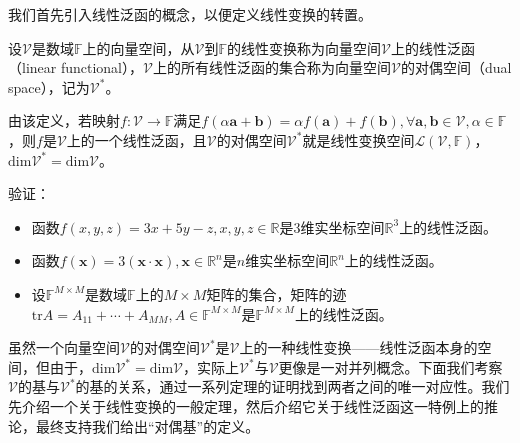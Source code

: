 \documentclass[main.tex]{subfiles}
\begin{document}
我们首先引入线性泛函的概念，以便定义线性变换的转置。

\begin{definition}[线性泛函与对偶空间]\label{def:II.4.4}
设$\mathcal{V}$是数域$\mathbb{F}$上的向量空间，从$\mathcal{V}$到$\mathbb{F}$的线性变换称为向量空间$\mathcal{V}$上的线性泛函（linear functional），$\mathcal{V}$上的所有线性泛函的集合称为向量空间$\mathcal{V}$的对偶空间（dual space），记为$\mathcal{V}^*$。
\end{definition}

由该定义，若映射$f:\mathcal{V}\rightarrow\mathbb{F}$满足$f\left(\alpha\mathbf{a}+\mathbf{b}\right)=\alpha f\left(\mathbf{a}\right)+f\left(\mathbf{b}\right),\forall\mathbf{a},\mathbf{b}\in\mathcal{V},\alpha\in\mathbb{F}$，则$f$是$\mathcal{V}$上的一个线性泛函，且$\mathcal{V}$的对偶空间$\mathcal{V}^*$就是线性变换空间$\mathcal{L}\left(\mathcal{V},\mathbb{F}\right)$，$\mathrm{dim}\mathcal{V}^*=\mathrm{dim}\mathcal{V}$。

\begin{example}
验证：
\begin{itemize}
    \item 函数$f\left(x,y,z\right)=3x+5y-z,x,y,z\in\mathbb{R}$是3维实坐标空间$\mathbb{R}^3$上的线性泛函。
    \item 函数$f\left(\mathbf{x}\right)=3\left(\mathbf{x}\cdot\mathbf{x}\right),\mathbf{x}\in\mathbb{R}^n$是$n$维实坐标空间$\mathbb{R}^n$上的线性泛函。
    \item 设$\mathbb{F}^{M\times M}$是数域$\mathbb{F}$上的$M\times M$矩阵的集合，矩阵的迹$\mathrm{tr}A=A_{11}+\cdots+A_{MM},A\in\mathbb{F}^{M\times M}$是$\mathbb{F}^{M\times M}$上的线性泛函。
\end{itemize}
\end{example}

虽然一个向量空间$\mathcal{V}$的对偶空间$\mathcal{V}^*$是$\mathcal{V}$上的一种线性变换——线性泛函本身的空间，但由于，$\mathrm{dim}\mathcal{V}^*=\mathrm{dim}\mathcal{V}$，实际上$\mathcal{V}^*$与$\mathcal{V}$更像是一对并列概念。下面我们考察$\mathcal{V}$的基与$\mathcal{V}^*$的基的关系，通过一系列定理的证明找到两者之间的唯一对应性。我们先介绍一个关于线性变换的一般定理，然后介绍它关于线性泛函这一特例上的推论，最终支持我们给出“对偶基”的定义。
\end{document}
